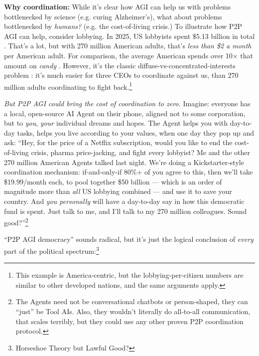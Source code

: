 \documentclass[11pt]{article}
\begin{document}
\textbf{Why coordination:} While it's clear how AGI can help us with problems bottlenecked by science (e.g. curing Alzheimer's), what about problems bottlenecked by \textit{humans?} (e.g. the cost-of-living crisis.) To illustrate how P2P AGI can help, consider lobbying. In 2025, US lobbyists spent \$5.13 billion in total \citep{opensecrets_lobbying}. That's a lot, but with 270 million American adults, that's \textit{less than \$2 a month} per American adult. For comparison, the average American spends over 10$\times$ that amount on \textit{candy} \citep{nca_candy_2024}. However, it's the classic diffuse-vs-concentrated-interests problem \citep{olson_collective_action}: it's much easier for three CEOs to coordinate against us, than 270 million adults coordinating to fight back.\footnote{This example is America-centric, but the lobbying-per-citizen numbers are similar to other developed nations, and the same arguments apply.}

\textit{But P2P AGI could bring the cost of coordination to zero.} Imagine: everyone has a local, open-source AI Agent on their phone, aligned not to some corporation, but to \textit{you}, \textit{your} individual dreams and hopes. The Agent helps you with day-to-day tasks, helps you live according to your values, when one day they pop up and ask: ``Hey, for the price of a Netflix subscription, would you like to end the cost-of-living crisis, pharma price-jacking, and fight every lobbyist? Me and the other 270 million American Agents talked last night. We're doing a Kickstarter-style coordination mechanism: if-and-only-if 80\%+ of you agree to this, then we'll take \$19.99/month each, to pool together \$50 billion — which is an order of magnitude more than \textit{all} US lobbying combined — and use it to save your country. And \textit{you personally} will have a day-to-day say in how this democratic fund is spent. Just talk to me, and I'll talk to my 270 million colleagues. Sound good?''\footnote{The Agents need not be conversational chatbots or person-shaped, they can ``just'' be Tool AIs. Also, they wouldn't literally do all-to-all communication, that scales terribly, but they could use any other proven P2P coordination protocol.}

``P2P AGI democracy'' sounds radical, but it's just the logical conclusion of \textit{every} part of the political spectrum:\footnote{Horseshoe Theory but Lawful Good?}
\end{document}
